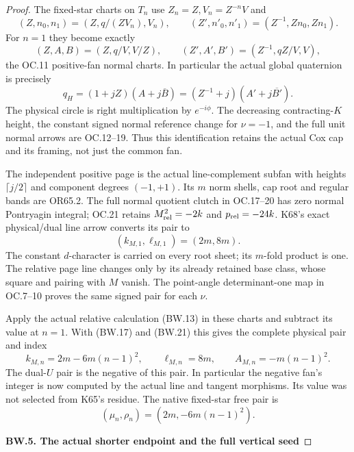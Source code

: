 \begin{proof}
The fixed-star charts on \(T_n\) use
\(Z_n=Z,V_n=Z^{-n}V\) and
\[
 (Z,n_0,n_1)=(Z,q/(ZV_n),V_n),\qquad
 (Z',n'_0,n'_1)=(Z^{-1},Zn_0,Zn_1).
                                                        \tag{BW.18}
\]
For \(n=1\) they become exactly
\[
 (Z,A,B)=(Z,q/V,V/Z),\qquad
 (Z',A',B')=(Z^{-1},qZ/V,V),
                                                        \tag{BW.19}
\]
the OC.11 positive-fan normal charts. In particular the
actual global quaternion is precisely
\[
 q_H=(1+jZ)(A+j\overline B)
     =(Z^{-1}+j)(A'+j\overline {B'}).
                                                        \tag{BW.20}
\]
The physical circle is right multiplication by \(e^{-i\phi}\).
The decreasing contracting-\(K\) height, the constant signed
normal reference change for \(\nu=-1\), and the full unit
normal arrows are OC.12--19. Thus this identification retains
the actual Cox cap and its framing, not just the common fan.

The independent positive page is the actual line-complement
subfan with heights \(\lceil j/2\rceil\) and component degrees
\((-1,+1)\). Its \(m\) norm shells, cap root and regular bands
are OR65.2. The full normal quotient clutch in OC.17--20 has
zero normal Pontryagin integral; OC.21 retains
\(M_{\rm rel}^2=-2k\) and \(p_{\rm rel}=-24k\). K68's exact
physical/dual line arrow converts its pair to
\[
                      (k_{M,1},\ell_{M,1})=(2m,8m).
                                                        \tag{BW.21}
\]
The constant \(d\)-character is carried on every root sheet;
its \(m\)-fold product is one. The relative page line changes
only by its already retained base class, whose square and
pairing with \(M\) vanish. The point-angle determinant-one
map in OC.7--10 proves the same signed pair for each \(\nu\).

Apply the actual relative calculation (BW.13) in these charts
and subtract its value at \(n=1\). With (BW.17) and (BW.21)
this gives the complete physical pair and index
\[
 \boxed{\quad k_{M,n}=2m-6m(n-1)^2,\qquad
 \ell_{M,n}=8m,\qquad A_{M,n}=-m(n-1)^2.\quad}
                                                        \tag{BW.22}
\]
The dual-\(U\) pair is the negative of this pair. In particular
the negative fan's integer is now computed by the actual line
and tangent morphisms. Its value was not selected from K65's
residue. The native fixed-star free pair is
\[
               (\mu_n,\rho_n)=(2m,-6m(n-1)^2).       \tag{BW.23}
\]

\par

\medskip\noindent\textbf{BW.5. The actual shorter endpoint and the full vertical seed}


\end{proof}
